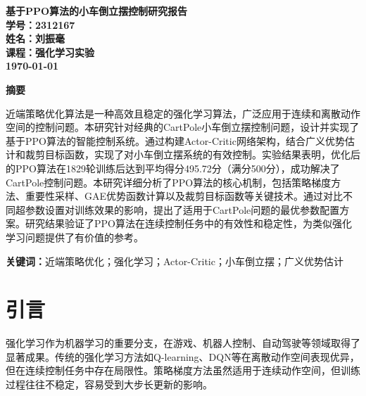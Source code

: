 \documentclass[12pt,a4paper]{article}
\begin{document}
\begin{titlepage}
    \centering
    \vspace*{2cm}
    \heiti\fontsize{22pt}{\baselineskip}\bfseries
    基于PPO算法的小车倒立摆控制研究报告\\[2cm]
    \songti\fontsize{14pt}{\baselineskip}
    学号：2312167\\[0.5cm]
    姓名：刘振毫\\[0.5cm]
    课程：强化学习实验\\[2cm]
    \today
\end{titlepage}

\newpage

\begin{center}
    \heiti\fontsize{18pt}{\baselineskip}\bfseries
    摘\quad 要
\end{center}

\vspace{18pt}

\songti\fontsize{12pt}{20pt}\selectfont
\setlength{\parindent}{2em}

近端策略优化算法是一种高效且稳定的强化学习算法，广泛应用于连续和离散动作空间的控制问题。本研究针对经典的CartPole小车倒立摆控制问题，设计并实现了基于PPO算法的智能控制系统。通过构建Actor-Critic网络架构，结合广义优势估计和裁剪目标函数，实现了对小车倒立摆系统的有效控制。实验结果表明，优化后的PPO算法在1829轮训练后达到平均得分495.72分（满分500分），成功解决了CartPole控制问题。本研究详细分析了PPO算法的核心机制，包括策略梯度方法、重要性采样、GAE优势函数计算以及裁剪目标函数等关键技术。通过对比不同超参数设置对训练效果的影响，提出了适用于CartPole问题的最优参数配置方案。研究结果验证了PPO算法在连续控制任务中的有效性和稳定性，为类似强化学习问题提供了有价值的参考。

\vspace{12pt}

\noindent\textbf{关键词：}近端策略优化；强化学习；Actor-Critic；小车倒立摆；广义优势估计

\newpage

\tableofcontents

\newpage

\section{引言}

\songti\fontsize{12pt}{20pt}\selectfont

强化学习作为机器学习的重要分支，在游戏、机器人控制、自动驾驶等领域取得了显著成果。传统的强化学习方法如Q-learning、DQN等在离散动作空间表现优异，但在连续控制任务中存在局限性。策略梯度方法虽然适用于连续动作空间，但训练过程往往不稳定，容易受到大步长更新的影响。
\end{document}

